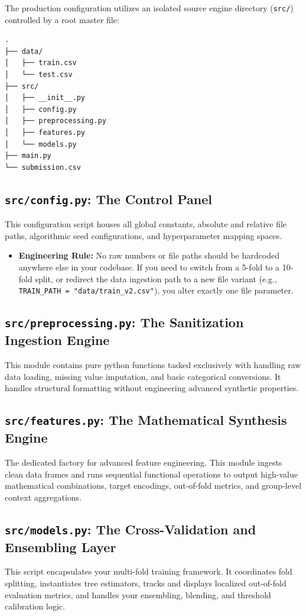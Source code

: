 \documentclass{article}
\begin{document}
The production configuration utilizes an isolated source engine directory (\texttt{src/}) controlled by a root master file:

\begin{verbatim}
.
├── data/
│   ├── train.csv
│   └── test.csv
├── src/
│   ├── __init__.py
│   ├── config.py
│   ├── preprocessing.py
│   ├── features.py
│   └── models.py
├── main.py
└── submission.csv
\end{verbatim}

\subsection{\texttt{src/config.py}: The Control Panel}
This configuration script houses all global constants, absolute and relative file paths, algorithmic seed configurations, and hyperparameter mapping spaces.
\begin{itemize}
    \item \textbf{Engineering Rule:} No raw numbers or file paths should be hardcoded anywhere else in your codebase. If you need to switch from a 5-fold to a 10-fold split, or redirect the data ingestion path to a new file variant (e.g., \texttt{TRAIN\_PATH = "data/train\_v2.csv"}), you alter exactly one file parameter.
\end{itemize}

\subsection{\texttt{src/preprocessing.py}: The Sanitization Ingestion Engine}
This module contains pure python functions tasked exclusively with handling raw data loading, missing value imputation, and basic categorical conversions. It handles structural formatting without engineering advanced synthetic properties.

\subsection{\texttt{src/features.py}: The Mathematical Synthesis Engine}
The dedicated factory for advanced feature engineering. This module ingests clean data frames and runs sequential functional operations to output high-value mathematical combinations, target encodings, out-of-fold metrics, and group-level context aggregations.

\subsection{\texttt{src/models.py}: The Cross-Validation and Ensembling Layer}
This script encapsulates your multi-fold training framework. It coordinates fold splitting, instantiates tree estimators, tracks and displays localized out-of-fold evaluation metrics, and handles your ensembling, blending, and threshold calibration logic.
\end{document}
